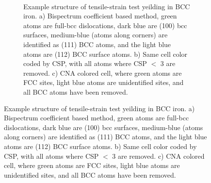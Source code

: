 \documentclass[12pt]{iopart}
\begin{document}
\begin{figure}[htbp]
\begin{figure}
\begin{center}
 \\
\caption{Example structure of tensile-strain test yeilding in BCC iron. a) Bispectrum coefficient based method, green atoms are full-bcc dislocations, dark blue are (100) bcc surfaces, medium-blue (atoms along corners) are identified as (111) BCC atoms, and the light blue atoms are (112) BCC surface atoms. b) Same cell color coded by CSP, with all atoms where CSP $<$ 3 are removed. c) CNA colored cell, where green atoms are FCC sites, light blue atoms are unidentified sites, and all BCC atoms have been removed.}
\label{fig:bcc_structures}
\end{center}
\end{figure}


\end{figure}
\end{document}
